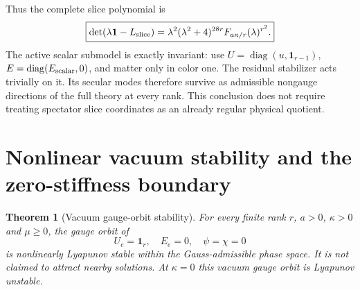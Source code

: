 \documentclass[11pt,a4paper]{article}
\newtheorem{theorem}{Theorem}\newtheorem{proposition}[theorem]{Proposition}\newtheorem{corollary}[theorem]{Corollary}
\newcommand{\id}{\mathbf1}\newcommand{\dd}{\mathrm d}\newcommand{\diag}{\operatorname{diag}}
\begin{document}
Thus the complete slice polynomial is
\begin{equation}
\boxed{\det(\lambda\id-L_{\rm slice})=
\lambda^2(\lambda^2+4)^{28r}F_{a\kappa/r}(\lambda)^{r^2}.}
\end{equation}
The active scalar submodel is exactly invariant: use $U=\diag(u,\id_{r-1})$, $E=\diag(E_{\rm scalar},0)$, and matter only in color one. The residual stabilizer acts trivially on it. Its secular modes therefore survive as admissible nongauge directions of the full theory at every rank. This conclusion does not require treating spectator slice coordinates as an already regular physical quotient.

\newpage
\section{Nonlinear vacuum stability and the zero-stiffness boundary}
\begin{theorem}[Vacuum gauge-orbit stability]
For every finite rank $r$, $a>0$, $\kappa>0$ and $\mu\geq0$, the gauge orbit of
\[
U_e=\id_r,\quad E_e=0,\quad\psi=\chi=0
\]
is nonlinearly Lyapunov stable within the Gauss-admissible phase space. It is not claimed to attract nearby solutions. At $\kappa=0$ this vacuum gauge orbit is Lyapunov unstable.
\end{theorem}
\end{document}
